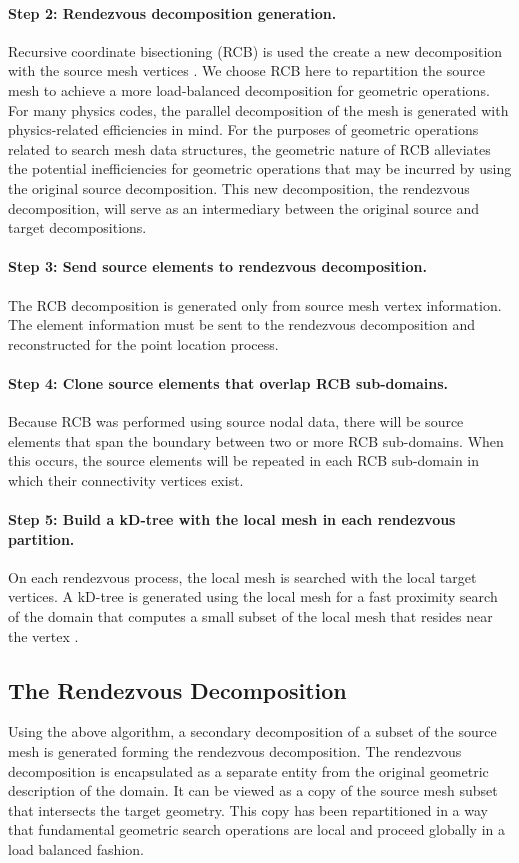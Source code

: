 \documentclass[letterpaper,12pt]{article}
\begin{document}
\paragraph{Step 2: Rendezvous decomposition generation.}
Recursive coordinate bisectioning (RCB) is used the create a new
decomposition with the source mesh vertices \cite{Berger_1987}. We
choose RCB here to repartition the source mesh to achieve a more
load-balanced decomposition for geometric operations. For many physics
codes, the parallel decomposition of the mesh is generated with
physics-related efficiencies in mind. For the purposes of geometric
operations related to search mesh data structures, the geometric
nature of RCB alleviates the potential inefficiencies for geometric
operations that may be incurred by using the original source
decomposition. This new decomposition, the rendezvous decomposition,
will serve as an intermediary between the original source and target
decompositions.

\paragraph{Step 3: Send source elements to rendezvous decomposition.}
The RCB decomposition is generated only from source mesh vertex
information. The element information must be sent to the rendezvous
decomposition and reconstructed for the point location process.

\paragraph{Step 4: Clone source elements that overlap RCB
  sub-domains.}  Because RCB was performed using source nodal data,
there will be source elements that span the boundary between two or
more RCB sub-domains. When this occurs, the source elements will be
repeated in each RCB sub-domain in which their connectivity vertices
exist.

\paragraph{Step 5: Build a kD-tree with the local mesh in each rendezvous
  partition.}  On each rendezvous process, the local mesh is searched
with the local target vertices. A kD-tree is generated using the local
mesh for a fast proximity search of the domain that computes a small
subset of the local mesh that resides near the vertex
\cite{Bentley_1975}.

\subsection{The Rendezvous Decomposition}\label{subsec:rendezvous_decomp}
Using the above algorithm, a secondary decomposition of a subset of
the source mesh is generated forming the rendezvous decomposition. The
rendezvous decomposition is encapsulated as a separate entity from the
original geometric description of the domain. It can be viewed as a
copy of the source mesh subset that intersects the target
geometry. This copy has been repartitioned in a way that fundamental
geometric search operations are local and proceed globally in a load
balanced fashion.
\end{document}

